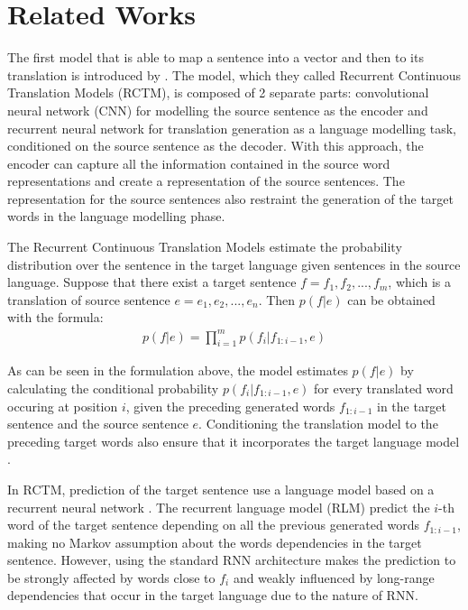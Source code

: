 \documentclass[12pt]{extarticle}
\begin{document}
\section*{Related Works}
The first model that is able to map a sentence into a vector and then to its translation is introduced by \citep{kalchbrenner-blunsom-2013-recurrent-continuous}. The model, which they called Recurrent Continuous Translation Models (RCTM), is composed of 2 separate parts: convolutional neural network (CNN) for modelling the source sentence as the encoder and recurrent neural network for translation generation as a language modelling task, conditioned on the source sentence as the decoder. With this approach, the encoder can capture all the information contained in the source word representations and create a representation of the source sentences. The representation for the source sentences also restraint the generation of the target words in the language modelling phase.

The Recurrent Continuous Translation Models estimate the probability distribution over the sentence in the target language given sentences in the source language. Suppose that there exist a target sentence $f = f_{1},f_{2},...,f_{m}$, which is a translation of source sentence $e = e_{1}, e_{2},...,e_{n}$. Then $p(f|e)$ can be obtained with the formula:
\begin{align} \label{eq:9}
p(f|e) = \prod_{i=1}^{m} p(f_{i}|f_{1:i-1}, e)
\end{align}

As can be seen in the formulation above, the model estimates $p(f|e)$ by calculating the conditional probability $p(f_{i}|f_{1:i-1}, e)$ for every translated word occuring at position $i$, given the preceding generated words $f_{1:i-1}$ in the target sentence and the source sentence $e$. Conditioning the translation model to the preceding target words also ensure that it incorporates the target language model \citep{kalchbrenner-blunsom-2013-recurrent-continuous}.

In RCTM, prediction of the target sentence use a language model based on a recurrent neural network \citep{DBLP:conf/interspeech/MikolovKBCK10}. The recurrent language model (RLM) predict the $i$-th word of the target sentence depending on all the previous generated words $f_{1:i-1}$, making no Markov assumption about the words dependencies in the target sentence. However, using the standard RNN architecture makes the prediction to be strongly affected by words close to $f_{i}$ and weakly influenced by long-range dependencies that occur in the target language due to the nature of RNN.
\end{document}
